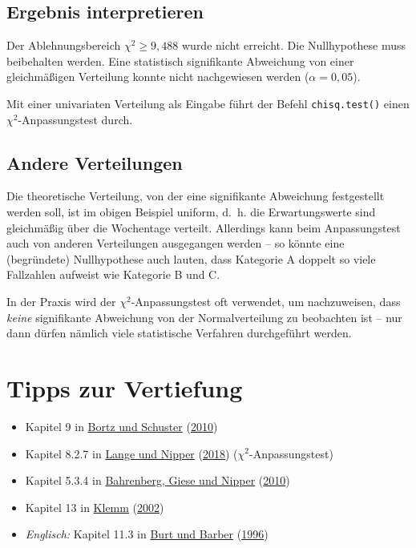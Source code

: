 \documentclass[
  11pt,
  ngerman,
  a4paper,
]{report}
\providecommand{\tightlist}{%
  \setlength{\itemsep}{0pt}\setlength{\parskip}{0pt}}
\newenvironment{rtip}{
  \medskip
  \begin{tcolorbox}[colframe=purple,colback=light_gray,title=Softwarehinweis]
}{
  \end{tcolorbox}
  \medskip
}
\begin{document}
\hypertarget{ergebnis-interpretieren-3}{%
\subsection{Ergebnis interpretieren}\label{ergebnis-interpretieren-3}}

Der Ablehnungsbereich \(\chi^2 \geq 9{,}488\) wurde nicht erreicht. Die Nullhypothese muss beibehalten werden. Eine statistisch signifikante Abweichung von einer gleichmäßigen Verteilung konnte nicht nachgewiesen werden (\(\alpha=0{,}05\)).

\begin{rtip}
Mit einer univariaten Verteilung als Eingabe führt der Befehl \verb|chisq.test()| einen $\chi^2$-Anpassungstest durch.
\end{rtip}

\hypertarget{andere-verteilungen}{%
\subsection{Andere Verteilungen}\label{andere-verteilungen}}

Die theoretische Verteilung, von der eine signifikante Abweichung festgestellt werden soll, ist im obigen Beispiel uniform, d.~h. die Erwartungswerte sind gleichmäßig über die Wochentage verteilt.
Allerdings kann beim Anpassungstest auch von anderen Verteilungen ausgegangen werden -- so könnte eine (begründete) Nullhypothese auch lauten, dass Kategorie A doppelt so viele Fallzahlen aufweist wie Kategorie B und C.

In der Praxis wird der \(\chi^2\)-Anpassungstest oft verwendet, um nachzuweisen, dass \emph{keine} signifikante Abweichung von der Normalverteilung zu beobachten ist -- nur dann dürfen nämlich viele statistische Verfahren durchgeführt werden.

\hypertarget{tipps-zur-vertiefung-9}{%
\section*{Tipps zur Vertiefung}\label{tipps-zur-vertiefung-9}}

\begin{itemize}
\tightlist
\item
  Kapitel 9 in \protect\hyperlink{ref-bortz}{Bortz und Schuster} (\protect\hyperlink{ref-bortz}{2010})
\item
  Kapitel 8.2.7 in \protect\hyperlink{ref-delange}{Lange und Nipper} (\protect\hyperlink{ref-delange}{2018}) (\(\chi^2\)-Anpassungstest)
\item
  Kapitel 5.3.4 in \protect\hyperlink{ref-bahrenberg}{Bahrenberg, Giese und Nipper} (\protect\hyperlink{ref-bahrenberg}{2010})
\item
  Kapitel 13 in \protect\hyperlink{ref-klemm}{Klemm} (\protect\hyperlink{ref-klemm}{2002})
\item
  \emph{Englisch:} Kapitel 11.3 in \protect\hyperlink{ref-burt}{Burt und Barber} (\protect\hyperlink{ref-burt}{1996})
\end{itemize}
\end{document}
